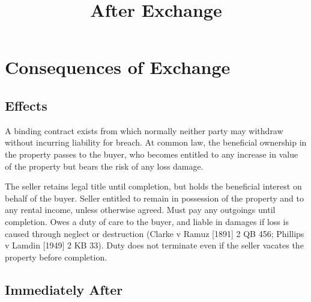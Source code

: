 \documentclass[
]{article}
\title{After Exchange}
\author{}
\date{}
\begin{document}
\maketitle

{
\setcounter{tocdepth}{3}
\tableofcontents
}
\hypertarget{consequences-of-exchange}{%
\section{Consequences of Exchange}\label{consequences-of-exchange}}

\hypertarget{effects}{%
\subsection{Effects}\label{effects}}

A binding contract exists from which normally neither party may withdraw
without incurring liability for breach. At common law, the beneficial
ownership in the property passes to the buyer, who becomes entitled to
any increase in value of the property but bears the risk of any loss
damage.

The seller retains legal title until completion, but holds the
beneficial interest on behalf of the buyer. Seller entitled to remain in
possession of the property and to any rental income, unless otherwise
agreed. Must pay any outgoings until completion. Owes a duty of care to
the buyer, and liable in damages if loss is caused through neglect or
destruction (Clarke v Ramuz {[}1891{]} 2 QB 456; Phillips v Lamdin
{[}1949{]} 2 KB 33). Duty does not terminate even if the seller vacates
the property before completion.

\hypertarget{immediately-after}{%
\subsection{Immediately After}\label{immediately-after}}
\end{document}
